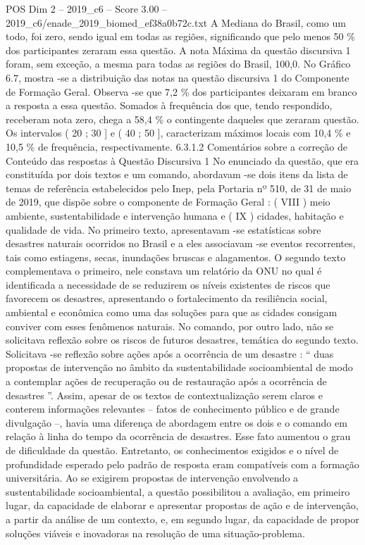 \begin{textsample}{POS Dim 2 – 2019\_c6 – Score 3.00 – 2019\_c6/enade\_2019\_biomed\_ef38a0b72c.txt}
A Mediana do Brasil, como um todo, foi zero, sendo igual em todas as regiões, significando que pelo menos 50 \% dos participantes zeraram essa questão.
A nota Máxima da questão discursiva 1 foram, sem exceção, a mesma para todas as regiões do Brasil, 100,0.
No Gráfico 6.7, mostra -se a distribuição das notas na questão discursiva 1 do Componente de Formação Geral.
Observa -se que 7,2 \% dos participantes deixaram em branco a resposta a essa questão.
Somados à frequência dos que, tendo respondido, receberam nota zero, chega a 58,4 \% o contingente daqueles que zeraram questão.
Os intervalos ( 20 ; 30 ] e ( 40 ; 50 ], caracterizam máximos locais com 10,4 \% e 10,5 \% de frequência, respectivamente. 6.3.1.2 Comentários sobre a correção de Conteúdo das respostas à Questão Discursiva 1 No enunciado da questão, que era constituída por dois textos e um comando, abordavam -se dois itens da lista de temas de referência estabelecidos pelo Inep, pela Portaria nº 510, de 31 de maio de 2019, que dispõe sobre o componente de Formação Geral : ( VIII ) meio ambiente, sustentabilidade e intervenção humana e ( IX ) cidades, habitação e qualidade de vida.
No primeiro texto, apresentavam -se estatísticas sobre desastres naturais ocorridos no Brasil e a eles associavam -se eventos recorrentes, tais como estiagens, secas, inundações bruscas e alagamentos.
O segundo texto complementava o primeiro, nele constava um relatório da ONU no qual é identificada a necessidade de se reduzirem os níveis existentes de riscos que favorecem os desastres, apresentando o fortalecimento da resiliência social, ambiental e econômica como uma das soluções para que as cidades consigam conviver com esses fenômenos naturais.
No comando, por outro lado, não se solicitava reflexão sobre os riscos de futuros desastres, temática do segundo texto.
Solicitava -se reflexão sobre ações após a ocorrência de um desastre : “ duas propostas de intervenção no âmbito da sustentabilidade socioambiental de modo a contemplar ações de recuperação ou de restauração após a ocorrência de desastres ”.
Assim, apesar de os textos de contextualização serem claros e conterem informações relevantes – fatos de conhecimento público e de grande divulgação –, havia uma diferença de abordagem entre os dois e o comando em relação à linha do tempo da ocorrência de desastres.
Esse fato aumentou o grau de dificuldade da questão.
Entretanto, os conhecimentos exigidos e o nível de profundidade esperado pelo padrão de resposta eram compatíveis com a formação universitária.
Ao se exigirem propostas de intervenção envolvendo a sustentabilidade socioambiental, a questão possibilitou a avaliação, em primeiro lugar, da capacidade de elaborar e apresentar propostas de ação e de intervenção, a partir da análise de um contexto, e, em segundo lugar, da capacidade de propor soluções viáveis e inovadoras na resolução de uma situação-problema.

\end{textsample}
